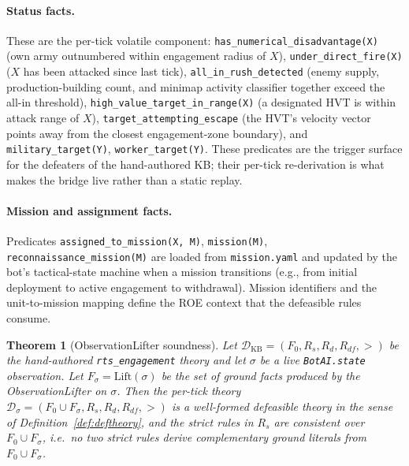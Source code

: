 \documentclass{article}
\newtheorem{theorem}{Theorem}[section]
\theoremstyle{definition}
\newcommand{\D}{\mathcal{D}}
\newcommand{\Rs}{R_s}
\newcommand{\Rd}{R_d}
\newcommand{\Rdf}{R_{df}}
\begin{document}
\paragraph{Status facts.} These are the per-tick volatile component: \texttt{has\_numerical\_disadvantage(X)} (own army outnumbered within engagement radius of $X$), \texttt{under\_direct\_fire(X)} ($X$ has been attacked since last tick), \texttt{all\_in\_rush\_detected} (enemy supply, production-building count, and minimap activity classifier together exceed the all-in threshold), \texttt{high\_value\_target\_in\_range(X)} (a designated HVT is within attack range of $X$), \texttt{target\_attempting\_escape} (the HVT's velocity vector points away from the closest engagement-zone boundary), and \texttt{military\_target(Y)}, \texttt{worker\_target(Y)}. These predicates are the trigger surface for the defeaters of the hand-authored KB; their per-tick re-derivation is what makes the bridge live rather than a static replay.

\paragraph{Mission and assignment facts.} Predicates \texttt{assigned\_to\_mission(X, M)}, \texttt{mission(M)}, \texttt{reconnaissance\_mission(M)} are loaded from \texttt{mission.yaml} and updated by the bot's tactical-state machine when a mission transitions (e.g., from initial deployment to active engagement to withdrawal). Mission identifiers and the unit-to-mission mapping define the ROE context that the defeasible rules consume.

\begin{theorem}[ObservationLifter soundness]\label{thm:lifter_sound}
Let $\D_{\mathrm{KB}} = (F_0, \Rs, \Rd, \Rdf, >)$ be the hand-authored \texttt{rts\_engagement} theory and let $\sigma$ be a live \texttt{BotAI.state} observation. Let $F_\sigma = \mathrm{Lift}(\sigma)$ be the set of ground facts produced by the ObservationLifter on $\sigma$. Then the per-tick theory $\D_\sigma = (F_0 \cup F_\sigma, \Rs, \Rd, \Rdf, >)$ is a well-formed defeasible theory in the sense of Definition~\ref{def:deftheory}, and the strict rules in $\Rs$ are consistent over $F_0 \cup F_\sigma$, i.e.\ no two strict rules derive complementary ground literals from $F_0 \cup F_\sigma$.
\end{theorem}
\end{document}
